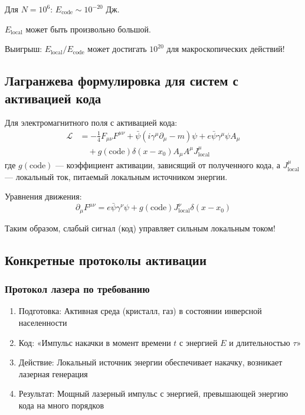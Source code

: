 \documentclass[11pt,a4paper]{article}
\begin{document}
	Для $N=10^6$: $E_{\text{code}} \sim 10^{-20}$ Дж.
	
	$E_{\text{local}}$ может быть произвольно большой.
	
	Выигрыш: $E_{\text{local}} / E_{\text{code}}$ может достигать $10^{20}$ для макроскопических действий!
	
	\subsection{Лагранжева формулировка для систем с активацией кода}
	
	Для электромагнитного поля с активацией кода:
	\begin{align}
		\mathcal{L} &= -\frac{1}{4} F_{\mu\nu} F^{\mu\nu} + \bar{\psi}(i\gamma^\mu\partial_\mu - m)\psi + e\bar{\psi}\gamma^\mu\psi A_\mu \\
		&\quad + g(\text{code}) \delta(x - x_0) A_\mu A^\mu J_{\text{local}}^\mu
	\end{align}
	где $g(\text{code})$ — коэффициент активации, зависящий от полученного кода, а $J_{\text{local}}^\mu$ — локальный ток, питаемый локальным источником энергии.
	
	Уравнения движения:
	\begin{equation}
		\partial_\mu F^{\mu\nu} = e\bar{\psi}\gamma^\nu\psi + g(\text{code}) J_{\text{local}}^\nu \delta(x - x_0)
	\end{equation}
	
	Таким образом, слабый сигнал (код) управляет сильным локальным током!
	
	\subsection{Конкретные протоколы активации}
	
	\subsubsection{Протокол лазера по требованию}
	\begin{enumerate}
		\item Подготовка: Активная среда (кристалл, газ) в состоянии инверсной населенности
		\item Код: «Импульс накачки в момент времени $t$ с энергией $E$ и длительностью $\tau$»
		\item Действие: Локальный источник энергии обеспечивает накачку, возникает лазерная генерация
		\item Результат: Мощный лазерный импульс с энергией, превышающей энергию кода на много порядков
	\end{enumerate}
	
\end{document}
